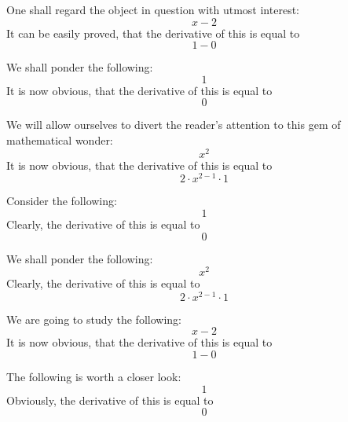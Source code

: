 \documentclass{article}
\begin{document}
One shall regard the object in question with utmost interest:
\begin{equation}
x - 2 
\end{equation}
It can be easily proved, that the derivative of this is equal to
\begin{equation}
1 - 0 
\end{equation}

We shall ponder the following:
\begin{equation}
1 
\end{equation}
It is now obvious, that the derivative of this is equal to
\begin{equation}
0 
\end{equation}

We will allow ourselves to divert the reader's attention to this gem of mathematical wonder:
\begin{equation}
x ^{2 } 
\end{equation}
It is now obvious, that the derivative of this is equal to
\begin{equation}
2 \cdot x ^{2 - 1 } \cdot 1 
\end{equation}

Consider the following:
\begin{equation}
1 
\end{equation}
Clearly, the derivative of this is equal to
\begin{equation}
0 
\end{equation}

We shall ponder the following:
\begin{equation}
x ^{2 } 
\end{equation}
Clearly, the derivative of this is equal to
\begin{equation}
2 \cdot x ^{2 - 1 } \cdot 1 
\end{equation}

We are going to study the following:
\begin{equation}
x - 2 
\end{equation}
It is now obvious, that the derivative of this is equal to
\begin{equation}
1 - 0 
\end{equation}

The following is worth a closer look:
\begin{equation}
1 
\end{equation}
Obviously, the derivative of this is equal to
\begin{equation}
0 
\end{equation}
\end{document}
